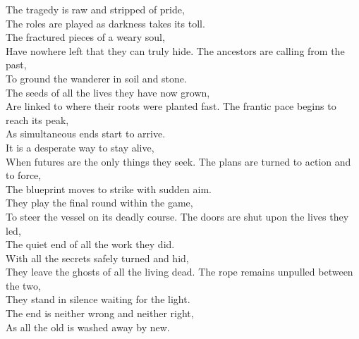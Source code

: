 \begin{lyrics}
The tragedy is raw and stripped of pride,\\
The roles are played as darkness takes its toll.\\
The fractured pieces of a weary soul,\\
Have nowhere left that they can truly hide.
The ancestors are calling from the past,\\
To ground the wanderer in soil and stone.\\
The seeds of all the lives they have now grown,\\
Are linked to where their roots were planted fast.
The frantic pace begins to reach its peak,\\
As simultaneous ends start to arrive.\\
It is a desperate way to stay alive,\\
When futures are the only things they seek.
The plans are turned to action and to force,\\
The blueprint moves to strike with sudden aim.\\
They play the final round within the game,\\
To steer the vessel on its deadly course.
The doors are shut upon the lives they led,\\
The quiet end of all the work they did.\\
With all the secrets safely turned and hid,\\
They leave the ghosts of all the living dead.
The rope remains unpulled between the two,\\
They stand in silence waiting for the light.\\
The end is neither wrong and neither right,\\
As all the old is washed away by new.
\end{lyrics}

